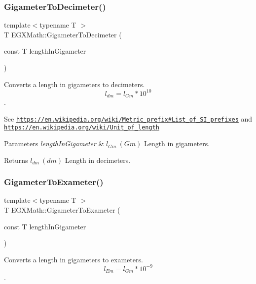 \subsubsection{\texorpdfstring{Gigameter\+To\+Decimeter()}{GigameterToDecimeter()}}
{\footnotesize\ttfamily template$<$typename T $>$ \\
T E\+G\+X\+Math\+::\+Gigameter\+To\+Decimeter (\begin{DoxyParamCaption}\item[{const T}]{length\+In\+Gigameter }\end{DoxyParamCaption})}



Converts a length in gigameters to decimeters. \[ l_{dm}=l_{Gm} * 10^{10} \]. 

See \href{https://en.wikipedia.org/wiki/Metric_prefix#List_of_SI_prefixes}{\tt https\+://en.\+wikipedia.\+org/wiki/\+Metric\+\_\+prefix\#\+List\+\_\+of\+\_\+\+S\+I\+\_\+prefixes} and \href{https://en.wikipedia.org/wiki/Unit_of_length}{\tt https\+://en.\+wikipedia.\+org/wiki/\+Unit\+\_\+of\+\_\+length} 
\begin{DoxyParams}{Parameters}
{\em length\+In\+Gigameter} & $ l_{Gm}\ (Gm)$ Length in gigameters. \\
\hline
\end{DoxyParams}
\begin{DoxyReturn}{Returns}
$ l_{dm}\ (dm)$ Length in decimeters. 
\end{DoxyReturn}
\mbox{\label{group___e_g_x_math-_conversions-_length_conversions-_gigameter-_s_i_ga38ebe6bd7f8d4dd09cadc8d08caf90eb}} 
\subsubsection{\texorpdfstring{Gigameter\+To\+Exameter()}{GigameterToExameter()}}
{\footnotesize\ttfamily template$<$typename T $>$ \\
T E\+G\+X\+Math\+::\+Gigameter\+To\+Exameter (\begin{DoxyParamCaption}\item[{const T}]{length\+In\+Gigameter }\end{DoxyParamCaption})}



Converts a length in gigameters to exameters. \[ l_{Em}=l_{Gm} * 10^{-9} \]. 

